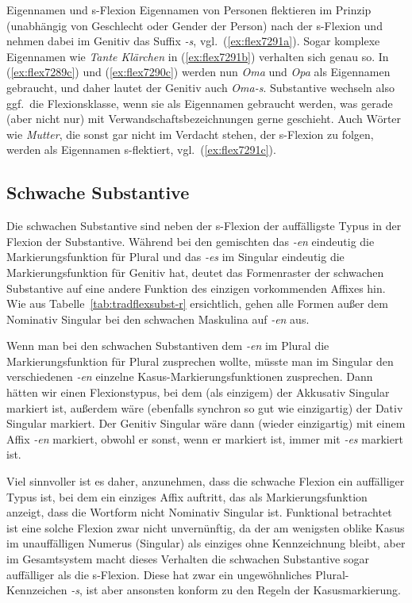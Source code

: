 \begin{Vertiefung}{Eigennamen und s-Flexion}
Eigennamen von Personen flektieren im Prinzip (unabhängig von Geschlecht oder Gender der Person) nach der s-Flexion und nehmen dabei im Genitiv das Suffix \textit{-s}, vgl.\ (\ref{ex:flex7291a}).
Sogar komplexe Eigennamen wie \textit{Tante Klärchen} in (\ref{ex:flex7291b}) verhalten sich genau so.
In (\ref{ex:flex7289c}) und (\ref{ex:flex7290c}) werden nun \textit{Oma} und \textit{Opa} als Eigennamen gebraucht, und daher lautet der Genitiv auch \textit{Oma-s}.
Substantive wechseln also ggf.\ die Flexionsklasse, wenn sie als Eigennamen gebraucht werden, was gerade (aber nicht nur) mit Verwandschaftsbezeichnungen gerne geschieht.
Auch Wörter wie \textit{Mutter}, die sonst gar nicht im Verdacht stehen, der s-Flexion zu folgen, werden als Eigennamen s-flektiert, vgl.\ (\ref{ex:flex7291c}).

\end{Vertiefung}

\subsection{Schwache Substantive}

\label{sec:schwachsubst}


Die schwachen Substantive sind neben der s-Flexion der auffälligste Typus in der Flexion der Substantive.
Während bei den gemischten das \textit{-en} eindeutig die Markierungsfunktion für Plural und das \textit{-es} im Singular eindeutig die Markierungsfunktion für Genitiv hat, deutet das Formenraster der schwachen Substantive auf eine andere Funktion des einzigen vorkommenden Affixes hin.
Wie aus Tabelle~\ref{tab:tradflexsubst-r} ersichtlich, gehen alle Formen außer dem Nominativ Singular bei den schwachen Maskulina auf \textit{-en} aus.

Wenn man bei den schwachen Substantiven dem \textit{-en} im Plural die Markierungsfunktion für Plural zusprechen wollte, müsste man im Singular den verschiedenen \textit{-en} einzelne Kasus-Markierungsfunktionen zusprechen.
Dann hätten wir einen Flexionstypus, bei dem (als einzigem) der Akkusativ Singular markiert ist, außerdem wäre (ebenfalls synchron so gut wie einzigartig) der Dativ Singular markiert.
Der Genitiv Singular wäre dann (wieder einzigartig) mit einem Affix \textit{-en} markiert, obwohl er sonst, wenn er markiert ist, immer mit \textit{-es} markiert ist.

Viel sinnvoller ist es daher, anzunehmen, dass die schwache Flexion ein auffälliger Typus ist, bei dem ein einziges Affix auftritt, das als Markierungsfunktion anzeigt, dass die Wortform nicht Nominativ Singular ist.
Funktional betrachtet ist eine solche Flexion zwar nicht unvernünftig, da der am wenigsten oblike Kasus im unauffälligen Numerus (Singular) als einziges ohne Kennzeichnung bleibt, aber im Gesamtsystem macht dieses Verhalten die schwachen Substantive sogar auffälliger als die s-Flexion.
Diese hat zwar ein ungewöhnliches Plural-Kennzeichen \textit{-s}, ist aber ansonsten konform zu den Regeln der Kasusmarkierung.

